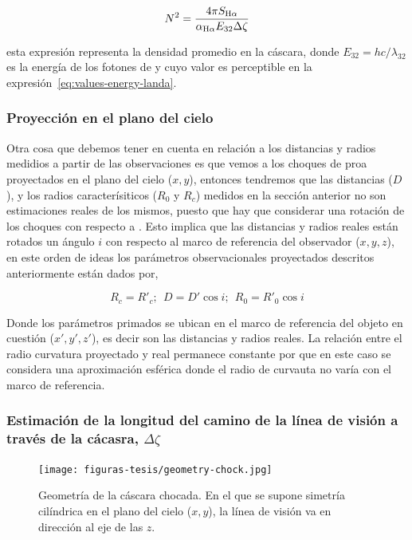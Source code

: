 \begin{equation}
  \label{eq:densidad}
  N^{2}=\frac{4 \pi S_{\mathrm{H}\alpha}}{\alpha_{\mathrm{H}\alpha} E_{32} \Delta \zeta}
\end{equation}

\noindent esta expresión representa la densidad promedio en la cáscara, donde \( E_{32} = hc/\lambda_{32}\) es la energía de los fotones de \ha{} y cuyo valor es perceptible en la expresión~\ref{eq:values-energy-landa}. 


\subsubsection{Proyección en el plano del cielo}
\label{sec:pro}

Otra cosa que debemos  tener en cuenta en relación a los distancias y radios medidios a partir de las observaciones es que vemos a los choques de proa proyectados en el plano del cielo (\(x, y\)), entonces tendremos que las distancias (\(D\)), y los  radios caracterísiticos (\(R_{0}\) y \(R_{c}\)) medidos en la sección anterior no son estimaciones reales de los mismos, puesto que hay que considerar una rotación de los choques con respecto a \thC{}. Esto implica que las distancias y radios reales están rotados un ángulo \(i\) con respecto al marco de referencia del observador (\(x, y, z\)), en este orden de ideas los parámetros observacionales proyectados descritos anteriormente están dados por,

\begin{equation*}
  R_{c} = R'_{c};~~
  D = D' \cos i;~~ 
  R_{0} = R'_{0} \cos i
\end{equation*}

Donde los parámetros primados se ubican en el marco de referencia del objeto en cuestión (\(x', y', z'\)), es decir son las distancias y radios reales. La relación entre el radio curvatura proyectado y real permanece constante por que en este caso se considera una aproximación esférica donde el radio de curvauta no varía con el marco de referencia. 

\subsubsection{Estimación de la longitud del camino de la línea de visión a través de la cácasra, \(\Delta \zeta\)}
\label{sec:camino}

\begin{figure}
  \centering
  \texttt{[image: figuras-tesis/geometry-chock.jpg]}
  \caption{Geometría de la cáscara chocada. En el que se supone simetría cilíndrica en el plano del cielo (\(x, y\)), la línea de visión va en dirección al eje de las \(z\).}
  \label{fig:geometria}
\end{figure}

